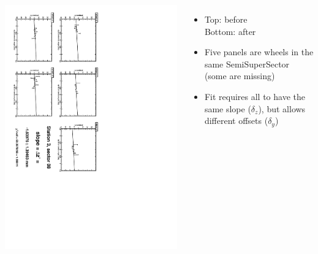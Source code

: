 \documentclass[compress]{beamer}
\begin{document}
\begin{frame}
\begin{columns}
\vfill
\includegraphics[height=\linewidth, angle=90]{zfits_after/zfit_3_08.pdf}
\begin{itemize}
\item Top: before \\ Bottom: after
\item Five panels are wheels in the same SemiSuperSector (some are missing)
\item Fit requires all to have the same slope ($\delta_z$), but allows different offsets ($\delta_y$)
\end{itemize}
\end{columns}
\end{frame}
\end{document}
